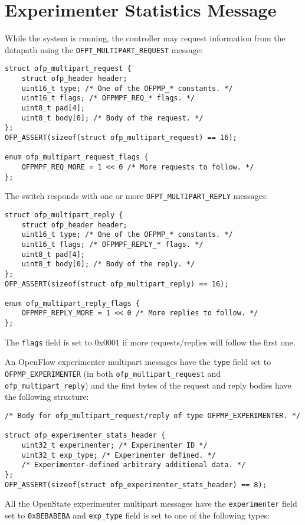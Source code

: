 \section{Experimenter Statistics Message}

\label{sec:msg_state_stats_proto}

While the system is running, the controller may request information from the datapath using the \texttt{OFPT\_MULTIPART\_REQUEST} message:

\scriptsize\begin{verbatim}
struct ofp_multipart_request {
    struct ofp_header header;
    uint16_t type; /* One of the OFPMP_* constants. */
    uint16_t flags; /* OFPMPF_REQ_* flags. */
    uint8_t pad[4];
    uint8_t body[0]; /* Body of the request. */
};
OFP_ASSERT(sizeof(struct ofp_multipart_request) == 16);

enum ofp_multipart_request_flags {
    OFPMPF_REQ_MORE = 1 << 0 /* More requests to follow. */
};
\end{verbatim}\normalsize
The switch responds with one or more \texttt{OFPT\_MULTIPART\_REPLY} messages:

\scriptsize\begin{verbatim}
struct ofp_multipart_reply {
    struct ofp_header header;
    uint16_t type; /* One of the OFPMP_* constants. */
    uint16_t flags; /* OFPMPF_REPLY_* flags. */
    uint8_t pad[4];
    uint8_t body[0]; /* Body of the reply. */
};
OFP_ASSERT(sizeof(struct ofp_multipart_reply) == 16);

enum ofp_multipart_reply_flags {
    OFPMPF_REPLY_MORE = 1 << 0 /* More replies to follow. */
};
\end{verbatim}\normalsize
The \texttt{flags} field is set to 0x0001 if more requests/replies will follow the first one.

An OpenFlow experimenter multipart messages have the \texttt{type} field set to \texttt{OFPMP\_EXPERIMENTER} (in both \texttt{ofp\_multipart\_request} and \texttt{ofp\_multipart\_reply}) and the first bytes of the request and reply bodies have the following structure:

\scriptsize\begin{verbatim}
/* Body for ofp_multipart_request/reply of type OFPMP_EXPERIMENTER. */

struct ofp_experimenter_stats_header {
    uint32_t experimenter; /* Experimenter ID */
    uint32_t exp_type; /* Experimenter defined. */
    /* Experimenter-defined arbitrary additional data. */
};
OFP_ASSERT(sizeof(struct ofp_experimenter_stats_header) == 8);
\end{verbatim}\normalsize
All the OpenState experimenter multipart messages have the \texttt{experimenter} field set to \texttt{0xBEBABEBA} and \texttt{exp\_type} field is set to one of the following types:

